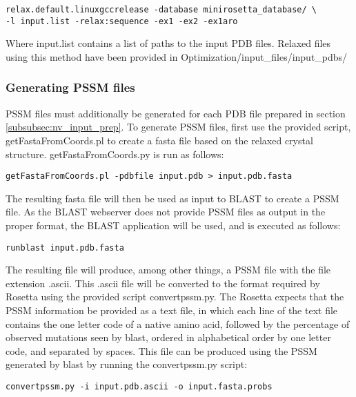 \singlespace
\begin{Verbatim}
relax.default.linuxgccrelease -database minirosetta_database/ \
-l input.list -relax:sequence -ex1 -ex2 -ex1aro
\end{Verbatim}
\doublespace

Where input.list contains a list of paths to the input \ac{PDB} files.
Relaxed files using this method have been provided in Optimization/input\_files/input\_pdbs/

\subsubsection{Generating \acs{PSSM} files}
\ac{PSSM} files must additionally be generated for each \ac{PDB} file prepared in section \ref{subsubsec:nv_input_prep}.
To generate \ac{PSSM} files, first use the provided script, getFastaFromCoords.pl to create a fasta file based on the relaxed crystal structure.
getFastaFromCoords.py is run as follows:

\singlespace
\begin{Verbatim}
getFastaFromCoords.pl -pdbfile input.pdb > input.pdb.fasta
\end{Verbatim}
\doublespace

The resulting fasta file will then be used as input to \ac{BLAST} to create a \ac{PSSM} file.
As the \ac{BLAST} webserver does not provide \ac{PSSM} files as output in the proper format, the \ac{BLAST} application will be used, and is executed as follows:

\singlespace
\begin{Verbatim}
runblast input.pdb.fasta
\end{Verbatim}
\doublespace

The resulting file will produce, among other things, a \ac{PSSM} file with the file extension .ascii.
This .ascii file will be converted to the format required by Rosetta using the provided script convertpssm.py.
The Rosetta expects that the \ac{PSSM} information be provided as a text file, in which each line of the text file contains the one letter code of a native amino acid, followed by the percentage of observed mutations seen by blast, ordered in alphabetical order by one letter code, and separated by spaces.
This file can be produced using the \ac{PSSM} generated by blast by running the convertpssm.py script:

\singlespace
\begin{Verbatim}
convertpssm.py -i input.pdb.ascii -o input.fasta.probs
\end{Verbatim}
\doublespace

